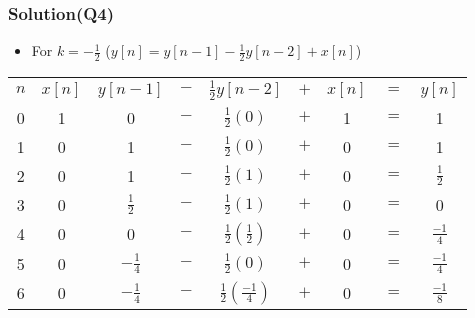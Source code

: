 \documentclass{beamer}
\begin{document}
\begin{frame}
\frametitle{Solution(Q4)}

\begin{itemize} \itemsep1pt \parskip0pt 
  \item[] For $k = -\frac{1}{2}$ ($y[n]=y[n-1]-\frac{1}{2}y[n-2]+x[n]$)
\end{itemize}

\begin{table}
\def\arraystretch{1.5}
\begin{tabular}{ccccccccc}
\hline
$n$ & $x[n]$ & $y[n-1]$ & $-$ & $\frac{1}{2}y[n-2]$ & $+$ & $x[n]$ & $=$ & $y[n]$ \\

0 & 1 & 0 & $-$ & $\frac{1}{2}(0)$ & $+$ & 1 & $=$ & 1 \\ 

1 & 0 & 1 & $-$ & $\frac{1}{2}(0)$ & $+$ & 0 & $=$ & 1 \\ 

2 & 0 & 1 & $-$ & $\frac{1}{2}(1)$ & $+$ & 0 & $=$ & $\frac{1}{2}$ \\ 

3 & 0 & $\frac{1}{2}$ & $-$ & $\frac{1}{2}(1)$ & $+$ & 0 & $=$ & 0 \\ 

4 & 0 & 0 & $-$ & $\frac{1}{2}(\frac{1}{2})$ & $+$ & 0 & $=$ & $\frac{-1}{4}$ \\ 
5 & 0 & $-\frac{1}{4}$ & $-$ & $\frac{1}{2}(0)$ & $+$ & 0 & $=$ & $\frac{-1}{4}$ \\ 

6 & 0 & $-\frac{1}{4}$ & $-$ & $\frac{1}{2}(\frac{-1}{4})$ & $+$ & 0 & $=$ & $\frac{-1}{8}$ \\ 
\hline
\end{tabular}
\end{table}


\end{frame}

\end{document}
